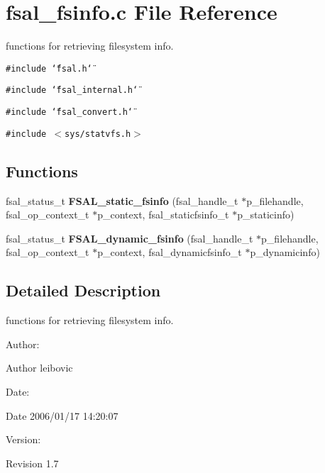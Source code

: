 \section{fsal\_\-fsinfo.c File Reference}
\label{fsal__fsinfo_8c}
functions for retrieving filesystem info.  


{\tt \#include \char`\"{}fsal.h\char`\"{}}\par
{\tt \#include \char`\"{}fsal\_\-internal.h\char`\"{}}\par
{\tt \#include \char`\"{}fsal\_\-convert.h\char`\"{}}\par
{\tt \#include $<$sys/statvfs.h$>$}\par
\subsection*{Functions}
\begin{CompactItemize}
\item 
fsal\_\-status\_\-t {\bf FSAL\_\-static\_\-fsinfo} (fsal\_\-handle\_\-t $\ast$p\_\-filehandle, fsal\_\-op\_\-context\_\-t $\ast$p\_\-context, fsal\_\-staticfsinfo\_\-t $\ast$p\_\-staticinfo)
\item 
fsal\_\-status\_\-t {\bf FSAL\_\-dynamic\_\-fsinfo} (fsal\_\-handle\_\-t $\ast$p\_\-filehandle, fsal\_\-op\_\-context\_\-t $\ast$p\_\-context, fsal\_\-dynamicfsinfo\_\-t $\ast$p\_\-dynamicinfo)
\end{CompactItemize}


\subsection{Detailed Description}
functions for retrieving filesystem info. 

\begin{Desc}
\item[Author:]\end{Desc}
\begin{Desc}
\item[Author]leibovic \end{Desc}
\begin{Desc}
\item[Date:]\end{Desc}
\begin{Desc}
\item[Date]2006/01/17 14:20:07 \end{Desc}
\begin{Desc}
\item[Version:]\end{Desc}
\begin{Desc}
\item[Revision]1.7 \end{Desc}



